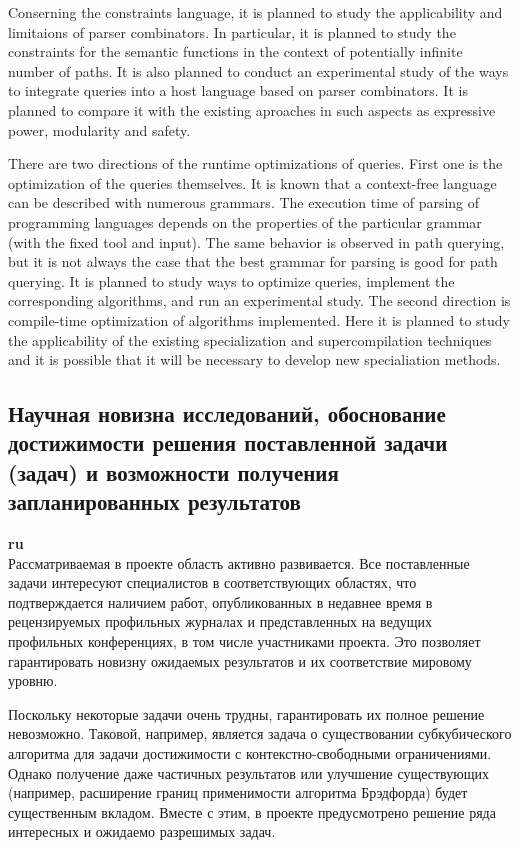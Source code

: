 \documentclass[12pt]{article}  %
\theoremstyle{remark}
\begin{document}
Conserning the constraints language, it is planned to study the applicability and limitaions of parser combinators.
In particular, it is planned to study the constraints for the semantic functions in the context of potentially infinite number of paths.
It is also planned to conduct an experimental study of the ways to integrate queries into a host language  based on parser combinators.
It is planned to compare it with the existing aproaches in such aspects as expressive power, modularity and safety.

There are two directions of the runtime optimizations of queries.
First one is the optimization of the queries themselves.
It is known that a context-free language can be described with numerous grammars.
The execution time of parsing of programming languages depends on the properties of the particular grammar (with the fixed tool and input).
The same behavior is observed in path querying, but it is not always the case that the best grammar for parsing is good for path querying.
It is planned to study ways to optimize queries, implement the corresponding algorithms, and run an experimental study.
The second direction is compile-time optimization of algorithms implemented.
Here it is planned to study the applicability of the existing specialization and supercompilation techniques and it is possible that it will be necessary to develop new specialiation methods.


\subsection{Научная новизна исследований, обоснование достижимости решения поставленной задачи (задач) и возможности получения запланированных результатов}

\textbf{ru}\\
%
Рассматриваемая в проекте область активно развивается. Все поставленные задачи интересуют специалистов в соответствующих областях, что подтверждается наличием работ, опубликованных в недавнее время в рецензируемых профильных журналах и представленных на ведущих профильных конференциях, в том числе участниками проекта. Это позволяет гарантировать новизну ожидаемых результатов и их соответствие мировому уровню.

Поскольку некоторые задачи очень трудны, гарантировать их полное решение невозможно. Таковой, например, является задача о существовании субкубического алгоритма для задачи достижимости с контекстно-свободными ограничениями. Однако получение даже частичных результатов или улучшение существующих (например, расширение границ применимости алгоритма Брэдфорда) будет существенным вкладом. Вместе с этим, в проекте предусмотрено решение ряда интересных и ожидаемо разрешимых задач.
\end{document}
